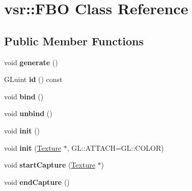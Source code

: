 \hypertarget{classvsr_1_1_f_b_o}{\section{vsr\-:\-:F\-B\-O Class Reference}
\label{classvsr_1_1_f_b_o}
}
\subsection*{Public Member Functions}
\begin{DoxyCompactItemize}
\item 
\hypertarget{classvsr_1_1_f_b_o_a4c857192ed6ff986f737199d64da374f}{void {\bfseries generate} ()}\label{classvsr_1_1_f_b_o_a4c857192ed6ff986f737199d64da374f}

\item 
\hypertarget{classvsr_1_1_f_b_o_aa9248b19c78e50750c8086dd92a701da}{G\-Luint {\bfseries id} () const }\label{classvsr_1_1_f_b_o_aa9248b19c78e50750c8086dd92a701da}

\item 
\hypertarget{classvsr_1_1_f_b_o_a5bc23647628e5754ce6a71206669ddf2}{void {\bfseries bind} ()}\label{classvsr_1_1_f_b_o_a5bc23647628e5754ce6a71206669ddf2}

\item 
\hypertarget{classvsr_1_1_f_b_o_ac91bb7f52a5d91aa59d492d2d97e81d4}{void {\bfseries unbind} ()}\label{classvsr_1_1_f_b_o_ac91bb7f52a5d91aa59d492d2d97e81d4}

\item 
\hypertarget{classvsr_1_1_f_b_o_a326b7e991eebf746f0d3eeafb247dc7b}{void {\bfseries init} ()}\label{classvsr_1_1_f_b_o_a326b7e991eebf746f0d3eeafb247dc7b}

\item 
\hypertarget{classvsr_1_1_f_b_o_aeca62cd97d013f2cf23a253d2067c0c6}{void {\bfseries init} (\hyperlink{classvsr_1_1_texture}{Texture} $\ast$, G\-L\-::\-A\-T\-T\-A\-C\-H=G\-L\-::\-C\-O\-L\-O\-R)}\label{classvsr_1_1_f_b_o_aeca62cd97d013f2cf23a253d2067c0c6}

\item 
\hypertarget{classvsr_1_1_f_b_o_a368f34149138d6fe0f23c7f0617b7e9f}{void {\bfseries start\-Capture} (\hyperlink{classvsr_1_1_texture}{Texture} $\ast$)}\label{classvsr_1_1_f_b_o_a368f34149138d6fe0f23c7f0617b7e9f}

\item 
\hypertarget{classvsr_1_1_f_b_o_ad4b2721b06688e73ffc056a27915e28a}{void {\bfseries end\-Capture} ()}\label{classvsr_1_1_f_b_o_ad4b2721b06688e73ffc056a27915e28a}


\end{DoxyCompactItemize}
